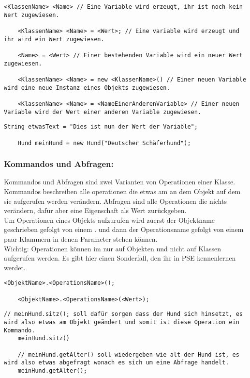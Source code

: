 \begin{lstlisting}[title=\textbf{Variablen Syntax}]
	<KlassenName> <Name> // Eine Variable wird erzeugt, ihr ist noch kein Wert zugewiesen.

	<KlassenName> <Name> = <Wert>; // Eine variable wird erzeugt und ihr wird ein Wert zugewiesen.
	
	<Name> = <Wert> // Einer bestehenden Variable wird ein neuer Wert zugewiesen.
	
	<KlassenName> <Name> = new <KlassenName>() // Einer neuen Variable wird eine neue Instanz eines Objekts zugewiesen.
	
	<KlassenName> <Name> = <NameEinerAnderenVariable> // Einer neuen Variable wird der Wert einer anderen Variable zugewiesen. 
\end{lstlisting}
\begin{lstlisting}[title=\textbf{Variable Beispiel}]
 	String etwasText = "Dies ist nun der Wert der Variable";
 	
 	Hund meinHund = new Hund("Deutscher Schäferhund");
\end{lstlisting}

\subsubsection*{Kommandos und Abfragen:}
Kommandos und Abfragen sind zwei Varianten von Operationen einer Klasse. Kommandos beschreiben alle operationen die etwas am an dem Objekt auf dem sie aufgerufen werden verändern.
Abfragen sind alle Operationen die nichts verändern, dafür aber eine Eigenschaft als Wert zurückgeben.\\
Um Operationen eines Objekts aufzurufen wird zuerst der Objektname geschrieben gefolgt von einem . und dann der Operationsname gefolgt von einem paar Klammern in denen Parameter stehen können.\\
{\color{red} Wichtig: } Operationen können im nur auf Objekten und nicht auf Klassen aufgerufen werden.
Es  gibt hier einen Sonderfall, den ihr in PSE kennenlernen werdet.

\begin{lstlisting}[title=\textbf{Kommando/Abfrage Syntax}]
	<ObjektName>.<OperationsName>();
	
	<ObjektName>.<OperationsName>(<Wert>);
\end{lstlisting}

\begin{lstlisting}[title=\textbf{Kommando/Abfrage Beispiel}]
    // meinHund.sitz(); soll dafür sorgen dass der Hund sich hinsetzt, es wird also etwas am Objekt geändert und somit ist diese Operation ein Kommando.
  	meinHund.sitz()

	// meinHund.getAlter() soll wiedergeben wie alt der Hund ist, es wird also etwas abgefragt wonach es sich um eine Abfrage handelt.
	meinHund.getAlter();
\end{lstlisting}

